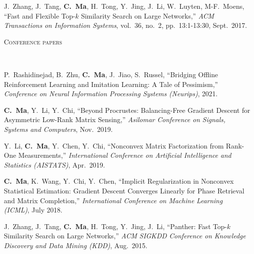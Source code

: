 \documentclass[a4paper, 10pt]{article}
\newenvironment{changemargin}[2]{%
  \begin{list}{}{%
    \setlength{\topsep}{0pt}%
    \setlength{\leftmargin}{#1}%
    \setlength{\rightmargin}{#2}%
    \setlength{\listparindent}{\parindent}%
    \setlength{\itemindent}{\parindent}%
    \setlength{\parsep}{\parskip}%
  }%
  \item[]}{\end{list}
}
\newcommand{\lineover}{
	\begin{changemargin}{-0.05in}{-0.05in}
		\vspace*{-8pt}
		\hrulefill \\
		\vspace*{-2pt}
	\end{changemargin}
}
\newcommand{\header}[1]{
	\begin{changemargin}{-0.5in}{-0.5in}
		\scshape{#1}\\
  	\lineover
	\end{changemargin}
}
\newenvironment{body} {
	\vspace*{-16pt}
	\begin{changemargin}{-0.3in}{-0.5in}
  }	
	{\end{changemargin}
}
\begin{document}
\begin{body}
\begin{enumerate}[label={[{J}{{\arabic*}}]}]
	
	\item J.~Zhang, J.~Tang, \textbf{C.~Ma}, H.~Tong, Y.~Jing, J.~Li, W.~Luyten, M-F.~Moens, {{``Fast and Flexible Top-$k$ Similarity Search on Large Networks,''}} \emph{ACM Transactions on Information Systems}, vol.~36, no.~2,  pp.~13:1-13:30, Sept.~2017.\\
	
\end{enumerate}
\end{body}

\bigskip
\header{\LARGE{Conference papers}}
\begin{body}
	\vspace{18pt}
	\begin{enumerate}[label={[{C}{{\arabic*}}]}]
	
	\item P.~Rashidinejad, B.~Zhu, \textbf{C.~Ma}, J.~Jiao, S.~Russel, {``Bridging Offline Reinforcement Learning and Imitation Learning: A Tale of Pessimism,''} \emph{Conference on Neural Information Processing Systems (Neurips)}, 2021. \\
	
	\item \textbf{C.~Ma}, Y.~Li, Y.~Chi, {``Beyond Procrustes: Balancing-Free Gradient Descent for Asymmetric Low-Rank Matrix Sensing,''} \emph{Asilomar Conference on Signals, Systems and Computers}, Nov.~2019. \\
	\item 
	Y.~Li, \textbf{C.~Ma}, Y.~Chen, Y.~Chi, {{``Nonconvex Matrix Factorization from Rank-One Measurements,''}} \emph{International Conference on Artificial Intelligence and Statistics (AISTATS)}, Apr.~2019. \\
	
	\item 
	\textbf{C.~Ma}, K.~Wang, Y.~Chi, Y.~Chen, {{``Implicit Regularization in Nonconvex Statistical Estimation: Gradient Descent Converges Linearly for Phase Retrieval and Matrix Completion,''}} \emph{International Conference on Machine Learning (ICML)}, July 2018. \\
	
	\item J.~Zhang, J.~Tang, \textbf{C.~Ma}, H.~Tong, Y.~Jing, J.~Li, {{``Panther: Fast Top-$k$ Similarity Search on Large Networks,''}} \emph{ACM SIGKDD Conference on Knowledge Discovery and Data Mining (KDD)}, Aug.~2015.\\
	
	
	\end{enumerate}
\end{body}
\end{document}
